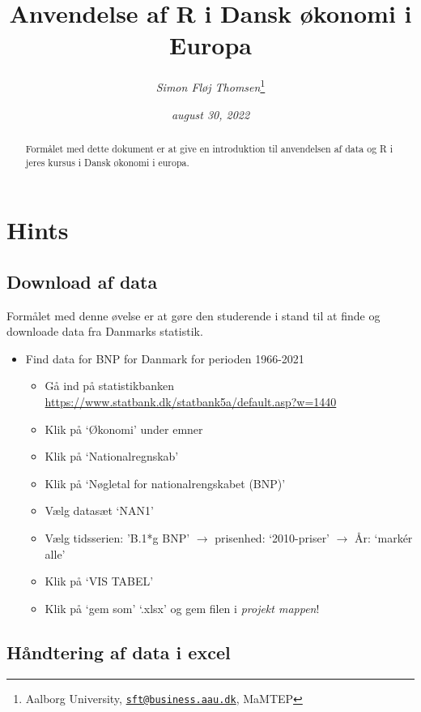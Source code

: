 \documentclass[
  12pt,
]{article}
\title{Anvendelse af R i Dansk økonomi i Europa}
\author{\emph{Simon Fløj Thomsen}\footnote{Aalborg University,
  \href{mailto:sft@business.aau.dk}{\nolinkurl{sft@business.aau.dk}},
  MaMTEP}}
\date{\emph{august 30, 2022}}
\providecommand{\tightlist}{%
  \setlength{\itemsep}{0pt}\setlength{\parskip}{0pt}}
\begin{document}
\maketitle
\begin{abstract}
\begingroup Formålet med dette dokument er at give en introduktion til
anvendelsen af data og R i jeres kursus i Dansk økonomi i europa.
\endgroup
\end{abstract}

\newpage

\hypertarget{hints}{%
\section{Hints}\label{hints}}

\hypertarget{download-af-data}{%
\subsection{Download af data}\label{download-af-data}}

Formålet med denne øvelse er at gøre den studerende i stand til at finde
og downloade data fra Danmarks statistik.

\begin{itemize}
\tightlist
\item
  Find data for BNP for Danmark for perioden 1966-2021

  \begin{itemize}
  \tightlist
  \item
    Gå ind på statistikbanken
    \url{https://www.statbank.dk/statbank5a/default.asp?w=1440}
  \item
    Klik på `Økonomi' under emner
  \item
    Klik på `Nationalregnskab'
  \item
    Klik på `Nøgletal for nationalrengskabet (BNP)'
  \item
    Vælg datasæt `NAN1'
  \item
    Vælg tidsserien: 'B.1*g BNP' \(\rightarrow\) prisenhed:
    `2010-priser' \(\rightarrow\) År: `markér alle'
  \item
    Klik på `VIS TABEL'
  \item
    Klik på `gem som' `.xlsx' og gem filen i \emph{projekt mappen}!
  \end{itemize}
\end{itemize}

\hypertarget{huxe5ndtering-af-data-i-excel}{%
\subsection{Håndtering af data i
excel}\label{huxe5ndtering-af-data-i-excel}}
\end{document}
